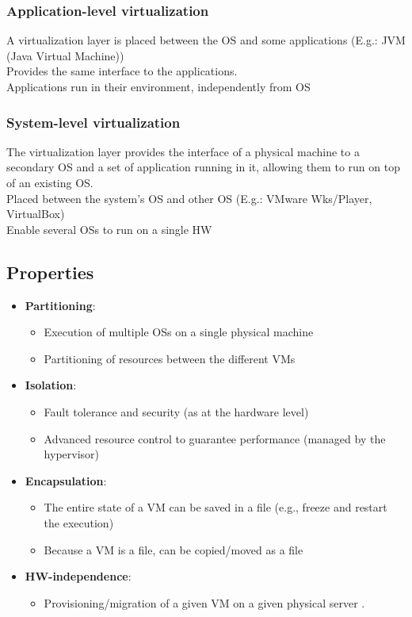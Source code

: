 \documentclass[10pt, oneside]{article}
\begin{document}
\subsubsection{Application-level virtualization}A virtualization layer is placed between
the OS and some applications (E.g.: JVM (Java Virtual Machine))\\Provides the same interface to the applications.\\Applications run in their environment, independently from OS
\subsubsection{System-level virtualization}The virtualization layer provides the interface of a physical machine to a secondary OS and a set of application running in it, allowing them to run on top of an existing OS.\\Placed between the system’s OS and other OS (E.g.: VMware Wks/Player, VirtualBox)\\Enable several OSs to run on a single HW

\subsection{Properties}
\begin{itemize}
    \item {\bf Partitioning}: \begin{itemize}
        \item Execution of multiple OSs on a single physical machine
        \item Partitioning of resources between the different VMs
    \end{itemize}
    \item {\bf Isolation}: \begin{itemize}
        \item Fault tolerance and security (as at the hardware level)
        \item Advanced resource control to guarantee performance
        (managed by the hypervisor)
    \end{itemize}
    \item {\bf Encapsulation}: \begin{itemize}
        \item The entire state of a VM can be saved in a file (e.g., freeze and restart the execution)
        \item Because a VM is a file, can be copied/moved as a file
    \end{itemize}
    \item {\bf HW-independence}: \begin{itemize}
        \item Provisioning/migration of a given VM on a given physical server .
    \end{itemize}
\end{itemize}
\end{document}
